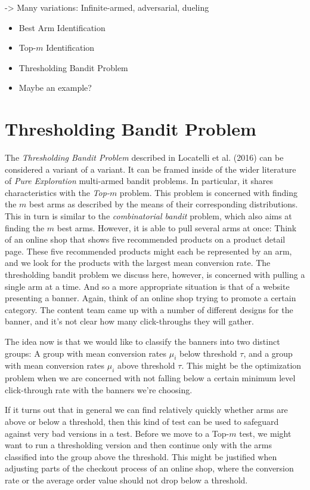 \documentclass[12pt,]{article}
\begin{document}
-\textgreater{} Many variations: Infinite-armed, adversarial, dueling

\begin{itemize}
\item
  Best Arm Identification
\item
  Top-\(m\) Identification
\item
  Thresholding Bandit Problem
\item
  Maybe an example?
\end{itemize}

\newpage

\section{Thresholding Bandit Problem}\label{thresholding-bandit-problem}

The \emph{Thresholding Bandit Problem} described in Locatelli et al.
(2016) can be considered a variant of a variant. It can be framed inside
of the wider literature of \emph{Pure Exploration} multi-armed bandit
problems. In particular, it shares characteristics with the
\emph{Top-\(m\)} problem. This problem is concerned with finding the
\(m\) best arms as described by the means of their corresponding
distributions. This in turn is similar to the \emph{combinatorial
bandit} problem, which also aims at finding the \(m\) best arms.
However, it is able to pull several arms at once: Think of an online
shop that shows five recommended products on a product detail page.
These five recommended products might each be represented by an arm, and
we look for the products with the largest mean conversion rate. The
thresholding bandit problem we discuss here, however, is concerned with
pulling a single arm at a time. And so a more appropriate situation is
that of a website presenting a banner. Again, think of an online shop
trying to promote a certain category. The content team came up with a
number of different designs for the banner, and it's not clear how many
click-throughs they will gather.

The idea now is that we would like to classify the banners into two
distinct groups: A group with mean conversion rates \(\mu_i\) below
threshold \(\tau\), and a group with mean conversion rates \(\mu_i\)
above threshold \(\tau\). This might be the optimization problem when we
are concerned with not falling below a certain minimum level
click-through rate with the banners we're choosing.

If it turns out that in general we can find relatively quickly whether
arms are above or below a threshold, then this kind of test can be used
to safeguard against very bad versions in a test. Before we move to a
Top-\(m\) test, we might want to run a thresholding version and then
continue only with the arms classified into the group above the
threshold. This might be justified when adjusting parts of the checkout
process of an online shop, where the conversion rate or the average
order value should not drop below a threshold.
\end{document}
